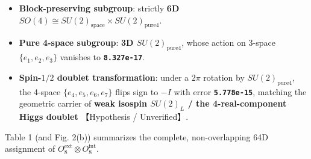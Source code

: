 \documentclass[
  a4paper,
]{article}
\providecommand{\tightlist}{%
  \setlength{\itemsep}{0pt}\setlength{\parskip}{0pt}}
\begin{document}
\begin{itemize}
\tightlist
\item
  \textbf{Block-preserving subgroup}: strictly \textbf{6D
  \(SO(4) \cong SU(2)_{\mathrm{space}} \times SU(2)_{\mathrm{pure4}}\)}.
\item
  \textbf{Pure 4-space subgroup}: \textbf{3D
  \(SU(2)_{\mathrm{pure4}}\)}, whose action on 3-space
  \(\{e_1,e_2,e_3\}\) vanishes to \textbf{\texttt{8.327e-17}}.
\item
  \textbf{Spin-\(1/2\) doublet transformation}: under a \(2\pi\)
  rotation by \(SU(2)_{\mathrm{pure4}}\), the 4-space
  \(\{e_4,e_5,e_6,e_7\}\) flips sign to \(-I\) with error
  \textbf{\texttt{5.778e-15}}, matching the geometric carrier of
  \textbf{weak isospin \(SU(2)_L\) / the 4-real-component Higgs doublet}
  【Hypothesis / Unverified】.
\end{itemize}

Table 1 (and Fig. 2(b)) summarizes the complete, non-overlapping 64D
assignment of \(O_8^{\mathrm{ext}} \otimes O_8^{\mathrm{int}}\).
\end{document}
